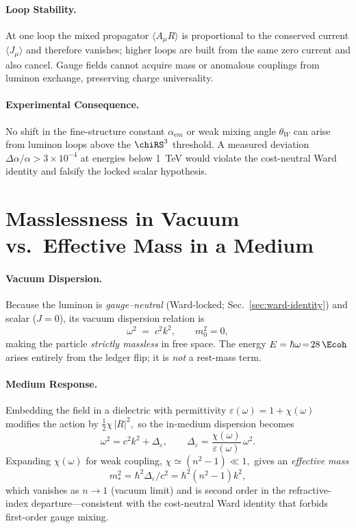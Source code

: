 \documentclass[11pt,oneside]{book}
\begin{document}
{\paragraph{Loop Stability.}
At one loop the mixed propagator
$\langle A_{\mu}R\rangle$ is proportional to the conserved current
\(
   \langle J_{\mu}\rangle
\)
and therefore vanishes; higher loops are built from the same
zero current and also cancel.  Gauge fields cannot acquire mass or
anomalous couplings from luminon exchange, preserving charge
universality.

\paragraph{Experimental Consequence.}
No shift in the fine-structure constant $\alpha_{\mathrm em}$ or weak
mixing angle $\theta_{W}$ can arise from luminon loops above the
$\chiRS^{3}$ threshold.  A measured deviation
\(
   \Delta\alpha/\alpha>3\times10^{-4}
\)
at energies below \SI{1}{\tera\electronvolt}
would violate the cost-neutral Ward identity and falsify the locked
scalar hypothesis.

\section{Masslessness in Vacuum vs.\ Effective Mass in a Medium}
\label{sec:luminon-mass}

\paragraph{Vacuum Dispersion.}
Because the luminon is \emph{gauge–neutral} (Ward-locked; Sec.~\ref{sec:ward-identity}) 
and scalar ($J\!=\!0$), its vacuum dispersion relation is  
\[
   \omega^{2}
   \;=\;
   c^{2}k^{2},
   \qquad
   m_{0}^{2}=0,
\]
making the particle \emph{strictly massless} in free space.  
The energy \(E=\hbar\omega\!=\!28\,\Ecoh\) arises entirely from the
ledger flip; it is \emph{not} a rest-mass term.

\paragraph{Medium Response.}
Embedding the field in a dielectric with permittivity
\(\varepsilon(\omega)\!=\!1+\chi(\omega)\) modifies the action by  
\(
   \tfrac12\chi\,|R|^{2},
\)
so the in-medium dispersion becomes
\[
   \omega^{2}
   = c^{2}k^{2} + \Delta_{\varepsilon},
   \qquad
   \Delta_{\varepsilon}
   = \frac{\chi(\omega)}{\varepsilon(\omega)}\,\omega^{2}.
   \label{eq:disp-medium}
\]
Expanding \(\chi(\omega)\) for weak coupling,
\(
   \chi\simeq(n^{2}-1)\ll1,
\)
gives an \emph{effective mass}
\[
   m_{\!*}^{2}\!
   = \hbar^{2}\Delta_{\varepsilon}/c^{2}
   = \hbar^{2}(n^{2}-1)k^{2},
\]
which vanishes as \(n\!\to\!1\) (vacuum limit) and is second order in
the refractive-index departure—consistent with the cost-neutral Ward
identity that forbids first-order gauge mixing.

}
\end{document}
